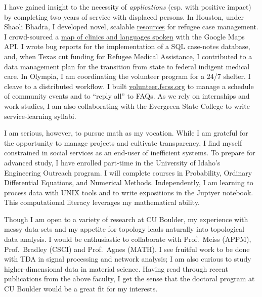 \documentclass{article}
\begin{document}
I have gained insight to the necessity of \emph{applications} (esp. with
positive impact) by completing two years of service with displaced persons.
In Houston, under Shaoli Bhadra, I developed novel, scalable
\href{https://github.com/coltongrainger/ymca-resources}{resources} for
refugee case management. I crowd-sourced a
\href{https://drive.google.com/open?id=1kk9yn6-4nifHLIf2tGYbW_7PiYo\&usp=sharing}{map
of clinics and languages spoken} with the Google Maps API. I wrote bug
reports for the implementation of a SQL case-notes database, and, when
Texas cut funding for Refugee Medical Assistance, I contributed to a
data management plan for the transition from state to federal indigent
medical care. In Olympia, I am coordinating the volunteer program for a
24/7 shelter. I cleave to a distributed workflow. I built
\href{http://volunteer.fscss.org}{volunteer.fscss.org} to manage a
schedule of community events and to ``reply all'' to FAQs. As we rely on
internships and work-studies, I am also collaborating with the 
Evergreen State College to write service-learning syllabi. 

I am serious, however, to pursue math as my vocation. While I am
grateful for the opportunity to manage projects and cultivate
transparency, I find myself constrained in social services
as an end-user of inefficient systems.
To prepare for advanced study, I have enrolled part-time in 
the University of Idaho's Engineering Outreach
program. I will complete courses in Probability, Ordinary Differential
Equations, and Numerical Methods.  Independently, I am
learning to process data with UNIX tools and to write 
expositions in the Juptyer notebook. This computational literacy leverages 
my mathematical ability.

Though I am open to a variety of research at CU Boulder,
my experience with messy data-sets and my appetite for topology leads
naturally into topological data analysis. I would be enthusiastic to
collaborate with Prof.\ Meiss (APPM), Prof.\ Bradley (CSCI) and Prof.\ Agnes
(MATH). I see fruitful work to be done with TDA in signal processing and
network analysis; I am also curious to study higher-dimensional data in
material science. Having read through
recent publications from the above faculty, I get the sense that the
doctoral program at CU Boulder would be a great fit for my
interests.
\end{document}
